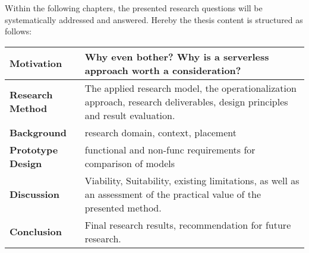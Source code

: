 \begin{minipage}{\textwidth}

    Within the following chapters, the presented research questions will be systematically addressed and answered. Hereby the thesis content is structured as follows:
    
    \begin{center}
        \begin{tabular}{ | m{11em} | m{23em}| } 
            \hline
             \textbf{Motivation} & 
             Why even bother? Why is a serverless approach worth a consideration?   \\
             \hline 
             
             \textbf{Research Method} &  
             The applied research model, the operationalization approach, research deliverables, design principles and result evaluation. \\
             \hline 
             
             \textbf{Background} & 
             research domain, context, placement \\
             \hline 
             
             \textbf{Prototype Design} & 
             functional and non-func requirements for comparison of models \\
             \hline 
             
             \textbf{Discussion} & 
             Viability, Suitability, existing limitations, as well as an assessment of the practical value of the presented method. \\
             \hline 
             
             \textbf{Conclusion} & 
             Final research results, recommendation for future research. \\
            \hline
        \end{tabular}
    \end{center}

\end{minipage}


